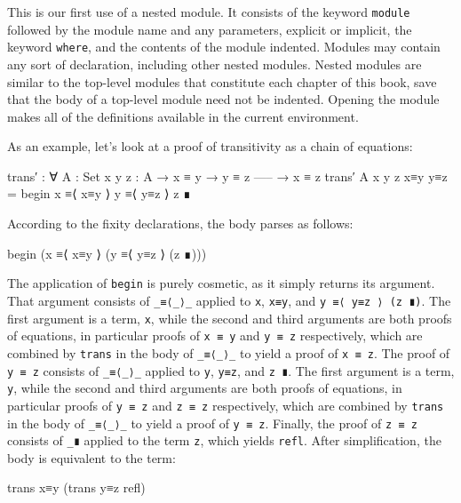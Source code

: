 This is our first use of a nested module. It consists of the keyword
\texttt{module} followed by the module name and any parameters, explicit
or implicit, the keyword \texttt{where}, and the contents of the module
indented. Modules may contain any sort of declaration, including other
nested modules. Nested modules are similar to the top-level modules that
constitute each chapter of this book, save that the body of a top-level
module need not be indented. Opening the module makes all of the
definitions available in the current environment.

As an example, let's look at a proof of transitivity as a chain of
equations:

\begin{fence}
\begin{code}
trans′ : ∀ {A : Set} {x y z : A}
  → x ≡ y
  → y ≡ z
    -----
  → x ≡ z
trans′ {A} {x} {y} {z} x≡y y≡z =
  begin
    x
  ≡⟨ x≡y ⟩
    y
  ≡⟨ y≡z ⟩
    z
  ∎
\end{code}
\end{fence}

According to the fixity declarations, the body parses as follows:

\begin{myDisplay}
begin (x ≡⟨ x≡y ⟩ (y ≡⟨ y≡z ⟩ (z ∎)))
\end{myDisplay}

The application of \texttt{begin} is purely cosmetic, as it simply
returns its argument. That argument consists of \texttt{\_≡⟨\_⟩\_}
applied to \texttt{x}, \texttt{x≡y}, and \texttt{y\ ≡⟨\ y≡z\ ⟩\ (z\ ∎)}.
The first argument is a term, \texttt{x}, while the second and third
arguments are both proofs of equations, in particular proofs of
\texttt{x\ ≡\ y} and \texttt{y\ ≡\ z} respectively, which are combined
by \texttt{trans} in the body of \texttt{\_≡⟨\_⟩\_} to yield a proof of
\texttt{x\ ≡\ z}. The proof of \texttt{y\ ≡\ z} consists of
\texttt{\_≡⟨\_⟩\_} applied to \texttt{y}, \texttt{y≡z}, and
\texttt{z\ ∎}. The first argument is a term, \texttt{y}, while the
second and third arguments are both proofs of equations, in particular
proofs of \texttt{y\ ≡\ z} and \texttt{z\ ≡\ z} respectively, which are
combined by \texttt{trans} in the body of \texttt{\_≡⟨\_⟩\_} to yield a
proof of \texttt{y\ ≡\ z}. Finally, the proof of \texttt{z\ ≡\ z}
consists of \texttt{\_∎} applied to the term \texttt{z}, which yields
\texttt{refl}. After simplification, the body is equivalent to the term:

\begin{myDisplay}
trans x≡y (trans y≡z refl)
\end{myDisplay}

